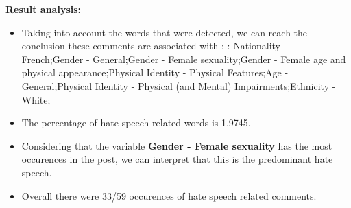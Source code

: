 \documentclass[11pt]{article}
\begin{document}
\textbf{\Large Result analysis:}

\begin{itemize}\item Taking into account the words that were detected, we can reach the conclusion these comments are associated with : : Nationality - French;Gender - General;Gender - Female sexuality;Gender - Female age and physical appearance;Physical Identity - Physical Features;Age - General;Physical Identity - Physical (and Mental) Impairments;Ethnicity - White;%

\item The percentage of hate speech related words is 1.9745.

\item Considering that the variable \textbf{Gender - Female sexuality} has the most occurences in the post, we can interpret that this is the predominant hate speech.

\item Overall there were 33/59 occurences of hate speech related comments.\end{itemize}
\end{document}
